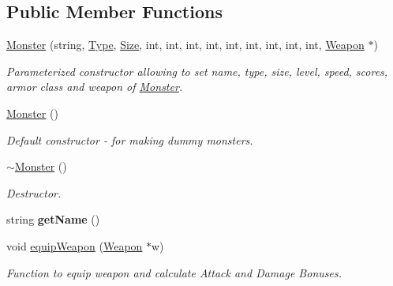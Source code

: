 \subsection*{Public Member Functions}
\begin{DoxyCompactItemize}
\item 
\hypertarget{class_monster_ac7222e2f2db276b4772d342361ca7444}{}\label{class_monster_ac7222e2f2db276b4772d342361ca7444} 
\hyperlink{class_monster_ac7222e2f2db276b4772d342361ca7444}{Monster} (string, \hyperlink{_entity_8h_a1d1cfd8ffb84e947f82999c682b666a7}{Type}, \hyperlink{_entity_8h_a1c40db1d9b56c27240e420765695f1c4}{Size}, int, int, int, int, int, int, int, int, int, \hyperlink{class_weapon}{Weapon} $\ast$)
\begin{DoxyCompactList}\small\item\em Parameterized constructor allowing to set name, type, size, level, speed, scores, armor class and weapon of \hyperlink{class_monster}{Monster}. \end{DoxyCompactList}\item 
\hypertarget{class_monster_a3dfc253fbec8331d42ac13c20bf9425f}{}\label{class_monster_a3dfc253fbec8331d42ac13c20bf9425f} 
\hyperlink{class_monster_a3dfc253fbec8331d42ac13c20bf9425f}{Monster} ()
\begin{DoxyCompactList}\small\item\em Default constructor -\/ for making dummy monsters. \end{DoxyCompactList}\item 
\hypertarget{class_monster_a21619ba1759b910cd2fd50d858aab338}{}\label{class_monster_a21619ba1759b910cd2fd50d858aab338} 
\hyperlink{class_monster_a21619ba1759b910cd2fd50d858aab338}{$\sim$\+Monster} ()
\begin{DoxyCompactList}\small\item\em Destructor. \end{DoxyCompactList}\item 
\hypertarget{class_monster_a6147ef9584d386252ec3b8d828701c85}{}\label{class_monster_a6147ef9584d386252ec3b8d828701c85} 
string {\bfseries get\+Name} ()
\item 
\hypertarget{class_monster_a89f0117018eb1fdd71d22fab070030e0}{}\label{class_monster_a89f0117018eb1fdd71d22fab070030e0} 
void \hyperlink{class_monster_a89f0117018eb1fdd71d22fab070030e0}{equip\+Weapon} (\hyperlink{class_weapon}{Weapon} $\ast$w)
\begin{DoxyCompactList}\small\item\em Function to equip weapon and calculate Attack and Damage Bonuses. \end{DoxyCompactList}\item 

\end{DoxyCompactItemize}
